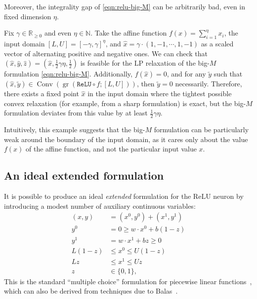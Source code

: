 \documentclass[smallextended]{svjour3}
\newcommand{\bbN}{\mathbb{N}}
\newcommand{\bbR}{\mathbb{R}}
\newcommand{\Conv}{\operatorname{Conv}}
\newcommand{\gr}{\operatorname{gr}}
\newcommand{\ReLu}{\texttt{ReLU}}
\begin{document}
Moreover, the integrality gap of \eqref{eqn:relu-big-M} can be arbitrarily bad, even in fixed dimension $\eta$.

\begin{example}
Fix $\gamma \in \bbR_{\geq 0}$ and even $\eta \in \bbN$.
Take the affine function $f(x) = \sum_{i=1}^\eta x_i$, the input domain $[L,U] = [-\gamma,\gamma]^\eta$, and $\hat{x} = \gamma \cdot (1,-1,\cdots,1,-1)$ as a scaled vector of alternating positive and negative ones. We can check that $(\hat{x},\hat{y},\hat{z}) = (\hat{x},\frac{1}{2}\gamma\eta,\frac{1}{2})$ is feasible for the LP relaxation of the big-$M$ formulation \eqref{eqn:relu-big-M}. Additionally, $f(\hat{x}) = 0$, and for any $\tilde{y}$ such that $(\hat{x},\tilde{y}) \in \Conv(\gr(\ReLu{} \circ f; [L,U]))$, then $\tilde{y} = 0$ necessarily. Therefore, there exists a fixed point $\hat{x}$ in the input domain where the tightest possible convex relaxation (for example, from a sharp formulation) is exact, but the big-$M$ formulation deviates from this value by at least $\frac{1}{2}\gamma\eta$.
\end{example}

Intuitively, this example suggests that the big-$M$ formulation can be particularly weak around the boundary of the input domain, as it cares only about the value $f(x)$ of the affine function, and not the particular input value $x$.

\subsection{An ideal extended formulation} \label{ssec:ideal-extended}

It is possible to produce an ideal \emph{extended} formulation for the ReLU neuron by introducing a modest number of auxiliary continuous variables:
\begin{subequations} \label{eqn:relu-ideal-extended}
\begin{align}
    (x,y) &= (x^0,y^0) + (x^1,y^1) \label{eqn:relu-ideal-extended-1} \\
    y^0 &= 0 \geq w \cdot x^0 + b(1-z) \label{eqn:relu-ideal-extended-2} \\
    y^1 &= w \cdot x^1 + bz \geq 0 \label{eqn:relu-ideal-extended-3} \\
    L(1-z) &\leq x^0 \leq U(1-z)\label{eqn:relu-ideal-extended-4} \\
    Lz &\leq x^1 \leq Uz \label{eqn:relu-ideal-extended-5} \\
    z &\in \{0,1\},
\end{align}
\end{subequations}
This is the standard ``multiple choice'' formulation for piecewise linear functions~\cite{Vielma:2009a}, which can also be derived from techniques due to Balas~\cite{Balas:1985,Balas:1998}.%
\end{document}
